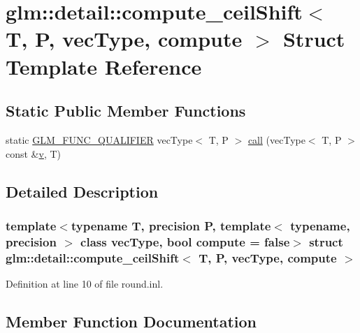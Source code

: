\hypertarget{structglm_1_1detail_1_1compute__ceil_shift}{}\section{glm\+::detail\+::compute\+\_\+ceil\+Shift$<$ T, P, vec\+Type, compute $>$ Struct Template Reference}
\label{structglm_1_1detail_1_1compute__ceil_shift}
\subsection*{Static Public Member Functions}
\begin{DoxyCompactItemize}
\item 
static \mbox{\hyperlink{setup_8hpp_a33fdea6f91c5f834105f7415e2a64407}{G\+L\+M\+\_\+\+F\+U\+N\+C\+\_\+\+Q\+U\+A\+L\+I\+F\+I\+ER}} vec\+Type$<$ T, P $>$ \mbox{\hyperlink{structglm_1_1detail_1_1compute__ceil_shift_a5b16bf873601c2400f4914ad609df30d}{call}} (vec\+Type$<$ T, P $>$ const \&\mbox{\hyperlink{glad_8h_a14cfbe2fc2234f5504618905b69d1e06}{v}}, T)
\end{DoxyCompactItemize}


\subsection{Detailed Description}
\subsubsection*{template$<$typename T, precision P, template$<$ typename, precision $>$ class vec\+Type, bool compute = false$>$\newline
struct glm\+::detail\+::compute\+\_\+ceil\+Shift$<$ T, P, vec\+Type, compute $>$}



Definition at line 10 of file round.\+inl.



\subsection{Member Function Documentation}
\mbox{\label{structglm_1_1detail_1_1compute__ceil_shift_a5b16bf873601c2400f4914ad609df30d}} 
